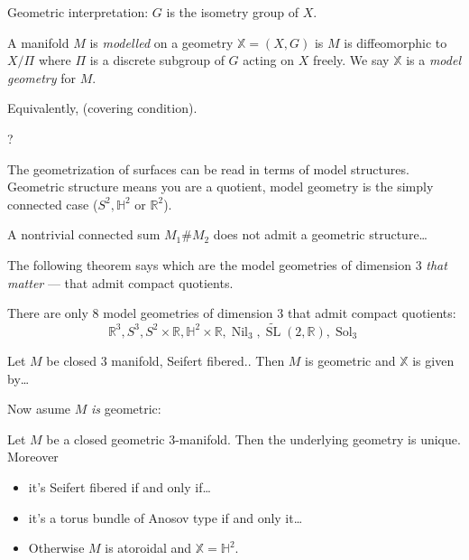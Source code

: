 \noindent
Geometric interpretation: $G$ is the
isometry group of $X$.

\begin{definition}
\label{definition-geometric-structure}
A manifold $M$ is {\it modelled} on a
geometry $\mathbb{X}=(X,G)$ is $M$ is
diffeomorphic to $X/\Pi$ where $\Pi$ is a
discrete subgroup of $G$ acting on $X $
freely. We say $\mathbb{X} $ is a {\it model
geometry} for $M$.
\end{definition}

\noindent
Equivalently, (covering condition).

\begin{definition}[missing]
\label{definition-missing}
?
\end{definition}

\noindent
The geometrization of surfaces can be read
in terms of model structures. Geometric
structure means you are a quotient, model
geometry is the simply connected case ($S^2,
\mathbb{H}^2$ or $\mathbb{R}^2$).

A nontrivial connected sum $M_1 \# M_2$ does
not admit a geometric structure…

The following theorem says which are the
model geometries of dimension 3
{\it that matter} --- that admit compact
quotients.

\begin{theorem}
\label{theorem-model-geometries}
There are only $8$ model geometries of
dimension 3 that admit compact quotients:
$$
\mathbb{R}^3, S^3, S^2 \times \mathbb{R},
\mathbb{H}^2 \times \mathbb{R},
\operatorname{Nil}_3,
\widetilde{\operatorname{SL}}(2,\mathbb{R}),
\operatorname{Sol}_3
$$
\end{theorem}
\begin{theorem}
\label{theorem-seifert-fibered}
Let $M$ be closed 3 manifold, Seifert
fibered.. Then $M$ is geometric and 
$\mathbb{X}$ is given by…
\end{theorem}

\noindent
Now asume $M$ {\it is} geometric:

\begin{theorem}
\label{theorem-classification-closed}
Let $M$ be a closed geometric 3-manifold.
Then the underlying geometry is unique.
Moreover
\begin{itemize}
\item it's Seifert fibered if and only if…
\item it's a torus bundle of Anosov type if
and only it…
\item Otherwise $M$ is atoroidal and
$\mathbb{X}= \mathbb{H}^2$. 
\end{itemize}
\end{theorem}

